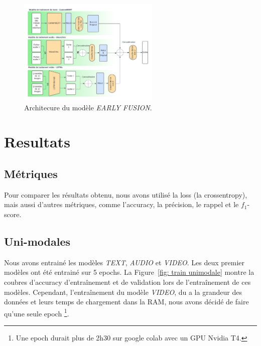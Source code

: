 \documentclass[a4paper]{article}
\begin{document}
\begin{figure}[H]
    \centering
    \includegraphics[width=0.6\textwidth]{early_fusion.png}
    \caption{Architecure du modèle \textit{EARLY FUSION}.}
    \label{fig: EARLY FUSION}
\end{figure}

\section{Resultats}

\subsection{Métriques}

Pour comparer les résultats obtenu, nous avons utilisé la loss (la crossentropy), mais aussi d'autres métriques,
comme l'accuracy, la précision, le rappel et le $f_1$-score.

\subsection{Uni-modales}

Nous avons entrainé les modèles \textit{TEXT}, \textit{AUDIO} et \textit{VIDEO}. Les deux premier modèles ont 
été entrainé sur 5 epochs. La Figure~\ref{fig: train unimodale} montre la coubres d'accuracy d'entraînement 
et de validation lors de l'entraînement de ces modèles.
Cependant, l'entraînement du modèle \textit{VIDEO}, du a la grandeur des données et 
leurs temps de chargement dans la RAM, nous avons décidé de faire qu'une seule epoch
\footnote{Une epoch durait plus de 2h30 sur google colab avec un GPU Nvidia T4.}.
\end{document}
